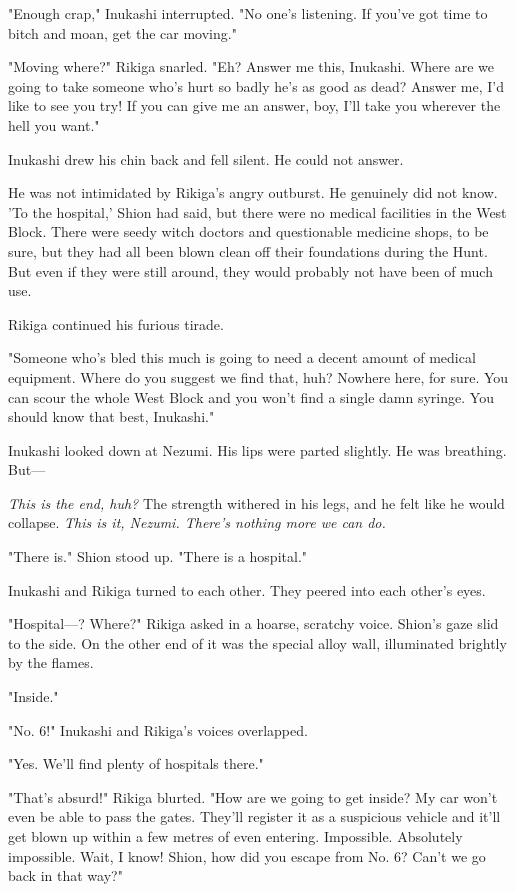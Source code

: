 "Enough crap," Inukashi interrupted. "No one's listening. If you've got
time to bitch and moan, get the car moving."

"Moving where?" Rikiga snarled. "Eh? Answer me this, Inukashi. Where are
we going to take someone who's hurt so badly he's as good as dead?
Answer me, I'd like to see you try! If you can give me an answer, boy,
I'll take you wherever the hell you want."

Inukashi drew his chin back and fell silent. He could not answer.

He was not intimidated by Rikiga's angry outburst. He genuinely did not
know. 'To the hospital,' Shion had said, but there were no medical
facilities in the West Block. There were seedy witch doctors and
questionable medicine shops, to be sure, but they had all been blown
clean off their foundations during the Hunt. But even if they were still
around, they would probably not have been of much use.

Rikiga continued his furious tirade.

"Someone who's bled this much is going to need a decent amount of
medical equipment. Where do you suggest we find that, huh? Nowhere here,
for sure. You can scour the whole West Block and you won't find a single
damn syringe. You should know that best, Inukashi."

Inukashi looked down at Nezumi. His lips were parted slightly. He was
breathing. But---

\emph{This is the end, huh?} The strength withered in his legs, and he felt
like he would collapse. \emph{This is it, Nezumi. There's nothing more we can
do.}

"There is." Shion stood up. "There is a hospital."

Inukashi and Rikiga turned to each other. They peered into each other's
eyes.

"Hospital---? Where?" Rikiga asked in a hoarse, scratchy voice. Shion's
gaze slid to the side. On the other end of it was the special alloy
wall, illuminated brightly by the flames.

"Inside."

"No. 6!" Inukashi and Rikiga's voices overlapped.

"Yes. We'll find plenty of hospitals there."

"That's absurd!" Rikiga blurted. "How are we going to get inside? My car
won't even be able to pass the gates. They'll register it as a
suspicious vehicle and it'll get blown up within a few metres of even
entering. Impossible. Absolutely impossible. Wait, I know! Shion, how
did you escape from No. 6? Can't we go back in that way?"

